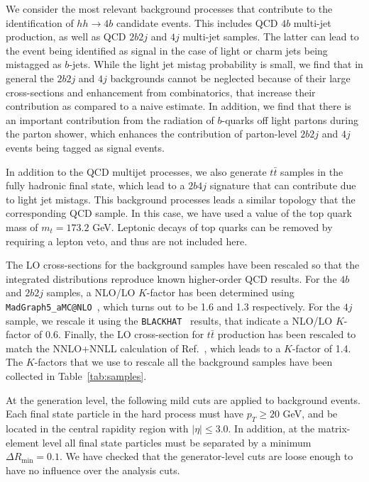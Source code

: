 We consider the most relevant background
processes that contribute to the identification of
 $hh\to 4b$ candidate events.
%
This includes  QCD $4b$ multi-jet production, as well as
QCD $2b2j$ and $4j$ multi-jet samples.
%
The latter can lead to the event being identified
as signal in the case of light or charm
jets being mistagged as $b$-jets.
%
While the light jet mistag probability is small, we find that
in general the $2b2j$ and $4j$ backgrounds cannot be neglected because
of their large cross-sections and enhancement from combinatorics, that
increase their contribution as compared to a naive estimate.
%
In addition, we find that there is an important contribution from the radiation
of $b$-quarks off light partons during the parton shower, which enhances the contribution
of parton-level $2b2j$ and $4j$ events being tagged as signal events.
%

In addition to the QCD multijet processes,
we also generate $t\bar{t}$ samples
in the fully hadronic final state, which lead to a
$2b4j$ signature that can
contribute due to light jet mistags.
%
This background processes leads a similar topology that
the corresponding QCD sample.
%
In this case,
we have used a value of the top quark mass of $m_t=173.2$ GeV.
%
Leptonic decays of top quarks can be removed by requiring
a lepton veto, and thus are not included here.

The LO cross-sections for
the background samples have been rescaled so that the integrated
distributions reproduce known higher-order QCD results.
%
For the $4b$ and $2b2j$ samples, a NLO/LO $K$-factor has been determined
using {\tt MadGraph5\_aMC@NLO}~\cite{Alwall:2014hca}, which turns out to be 1.6 and 1.3
respectively.
%
For the $4j$ sample, we rescale it using the {\tt BLACKHAT}~\cite{Bern:2011ep}
results, that indicate
a NLO/LO $K$-factor of 0.6.
%
Finally, the LO cross-section for $t\bar{t}$ production has been rescaled
to match the NNLO+NNLL calculation of Ref.~\cite{Czakon:2013goa}, which leads
to a $K$-factor of 1.4.
%
The $K$-factors that we use to rescale all the background samples have been collected in
Table~\ref{tab:samples}.


At the generation level, the following mild
cuts are applied to
background events.
%
Each final state particle in the hard process must have $p_T \ge 20$ GeV, and be located
in the central  rapidity
region with
$| \eta | \le 3.0$.
%
In addition, at the matrix-element level
all final state particles must be separated by a minimum $\Delta R_{\mathrm{min}} =0.1$.
%
We have checked that the generator-level cuts are loose enough to have
no influence over the analysis cuts.
%


